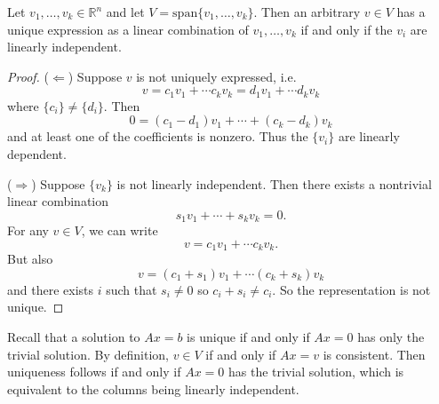 \documentclass[12pt]{article}
\begin{document}
\begin{proposition}
	Let $v_1,\dots, v_k\in\mathbb{R}^n$ and let $V=\text{span}\{v_1,\dots, v_k\}$. Then an arbitrary $v\in V$ has a unique expression as a linear combination of $v_1,\dots, v_k$ if and only if the $v_i$ are linearly independent. 
\end{proposition}
\begin{proof}
	($\Leftarrow$) Suppose $v$ is not uniquely expressed, i.e. 
	\begin{equation*}
		v = c_1v_1 + \cdots c_kv_k = d_1v_1 + \cdots d_kv_k
	\end{equation*}
	where $\{c_i\}\neq \{d_i\}$. Then 
	\begin{equation*}
		0 = (c_1-d_1)v_1 + \cdots + (c_k-d_k)v_k 
	\end{equation*}
	and at least one of the coefficients is nonzero. Thus the $\{v_i\}$ are linearly dependent.

	($\Rightarrow$) Suppose $\{v_k\}$ is not linearly independent. Then there exists a nontrivial linear combination 
	\begin{equation*}
		s_1v_1 + \cdots + s_kv_k = 0.
	\end{equation*}
	For any $v\in V$, we can write 
	\begin{equation*}
		v = c_1v_1 + \cdots c_kv_k.
	\end{equation*}
	But also 
	\begin{equation*}
		v = (c_1+s_1)v_1 + \cdots (c_k+s_k)v_k 
	\end{equation*}
	and there exists $i$ such that $s_i\neq 0$ so $c_i+s_i\neq c_i$. So the representation is not unique.
\end{proof}

\begin{remark}
	Recall that a solution to $Ax=b$ is unique if and only if $Ax=0$ has only the trivial solution. By definition, $v\in V$ if and only if $Ax=v$ is consistent. Then uniqueness follows if and only if $Ax=0$ has the trivial solution, which is equivalent to the columns being linearly independent.
\end{remark}
\end{document}
